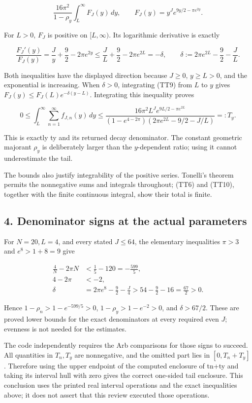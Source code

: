 \[
\frac{16\pi^2}{1-\rho_y}
\int_L^\infty F_J(y)\,dy,\qquad
F_J(y)=y^Je^{9y/2-\pi e^{2y}}.
\tag{TT8}
\]

For \(L>0\), \(F_J\) is positive on \([L,\infty)\). Its logarithmic derivative is exactly

\[
\frac{F_J'(y)}{F_J(y)}
=\frac Jy+\frac92-2\pi e^{2y}
\le\frac JL+\frac92-2\pi e^{2L}
=-\delta,\qquad
\delta:=2\pi e^{2L}-\frac92-\frac JL.
\tag{TT9}
\]

Both inequalities have the displayed direction because \(J\ge0\), \(y\ge L>0\), and the exponential is increasing. When \(\delta>0\), integrating (TT9) from \(L\) to \(y\) gives \(F_J(y)\le F_J(L)e^{-\delta(y-L)}\). Integrating this inequality proves

\[
\boxed{
0\le\int_L^\infty\sum_{n=1}^{\infty}f_{J,n}(y)\,dy
\le
\frac{16\pi^2L^Je^{9L/2-\pi e^{2L}}}
{(1-e^{4-2\pi})(2\pi e^{2L}-9/2-J/L)}
=:T_y.}
\tag{TT10}
\]

This is exactly ty and its returned decay denominator. The constant geometric majorant \(\rho_y\) is deliberately larger than the \(y\)-dependent ratio; using it cannot underestimate the tail.

The bounds also justify integrability of the positive series. Tonelli's theorem permits the nonnegative sums and integrals throughout; (TT6) and (TT10), together with the finite continuous integral, show their total is finite.

\subsection{4. Denominator signs at the actual parameters}\label{C47stage:TT:denominator-signs-at-the-actual-parameters}

For \(N=20,L=4\), and every stated \(J\le64\), the elementary inequalities \(\pi>3\) and \(e^8>1+8=9\) give

\[
\begin{aligned}
\frac4N-2\pi N&<\frac15-120=-\frac{599}{5},\\
4-2\pi&<-2,\\
\delta
&=2\pi e^8-\frac92-\frac J4
>54-\frac92-16=\frac{67}{2}>0.
\end{aligned}
\tag{TT11}
\]

Hence \(1-\rho_n>1-e^{-599/5}>0\), \(1-\rho_y>1-e^{-2}>0\), and \(\delta>67/2\). These are proved lower bounds for the exact denominators at every required even \(J\); evenness is not needed for the estimates.

The code independently requires the Arb comparisons for those signs to succeed. All quantities in \(T_n,T_y\) are nonnegative, and the omitted part lies in \([0,T_n+T_y]\). Therefore using the upper endpoint of the computed enclosure of tn+ty and taking its interval hull with zero gives the correct one-sided tail enclosure. This conclusion uses the printed real interval operations and the exact inequalities above; it does not assert that this review executed those operations.

